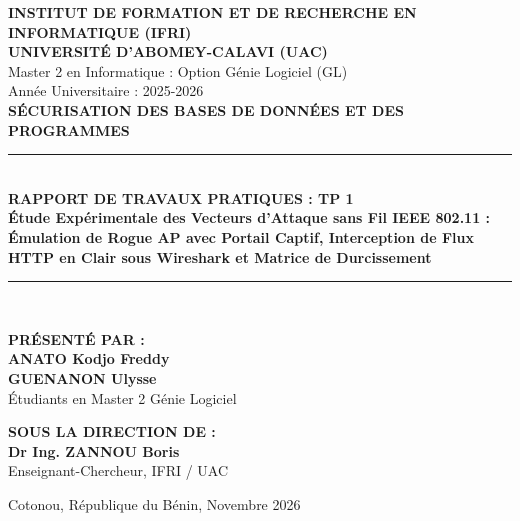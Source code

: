 \documentclass[a4paper,11pt]{article}
\begin{document}
\begin{titlepage}
  \begin{center}
    \vspace*{0.5cm}
    {\large\textbf{INSTITUT DE FORMATION ET DE RECHERCHE EN INFORMATIQUE (IFRI)}}\\[0.2cm]
    {\normalsize\textbf{UNIVERSITÉ D'ABOMEY-CALAVI (UAC)}}\\[0.3cm]
    {\small\textcolor{mutedgray}{Master 2 en Informatique : Option Génie Logiciel (GL)}}\\[0.2cm]
    {\small\textcolor{mutedgray}{Année Universitaire : 2025-2026}}\\[1.6cm]

    {\large\bfseries\textcolor{accentblue}{SÉCURISATION DES BASES DE DONNÉES ET DES PROGRAMMES}}\\[0.6cm]
    
    \rule{\linewidth}{1.2pt}\\[0.4cm]
    {\LARGE\bfseries\color{navy} RAPPORT DE TRAVAUX PRATIQUES : TP 1}\\[0.3cm]
    {\Large\bfseries\color{darktext} Étude Expérimentale des Vecteurs d'Attaque sans Fil IEEE 802.11 : Émulation de Rogue AP avec Portail Captif, Interception de Flux HTTP en Clair sous Wireshark et Matrice de Durcissement}\\[0.4cm]
    \rule{\linewidth}{1.2pt}\\[1.6cm]

    \begin{minipage}[t]{0.48\textwidth}
      \textbf{\textcolor{mutedgray}{PRÉSENTÉ PAR :}}\\[0.2cm]
      \textbf{ANATO Kodjo Freddy}\\
      \textbf{GUENANON Ulysse}\\[0.3cm]
      {\small Étudiants en Master 2 Génie Logiciel}
    \end{minipage}
    \hfill
    \begin{minipage}[t]{0.48\textwidth}
      \raggedleft
      \textbf{\textcolor{mutedgray}{SOUS LA DIRECTION DE :}}\\[0.2cm]
      \textbf{Dr Ing. ZANNOU Boris}\\[0.3cm]
      {\small Enseignant-Chercheur, IFRI / UAC}
    \end{minipage}

    \vfill
    {\small Cotonou, République du Bénin, Novembre 2026}
  \end{center}
\end{titlepage}
\end{document}
